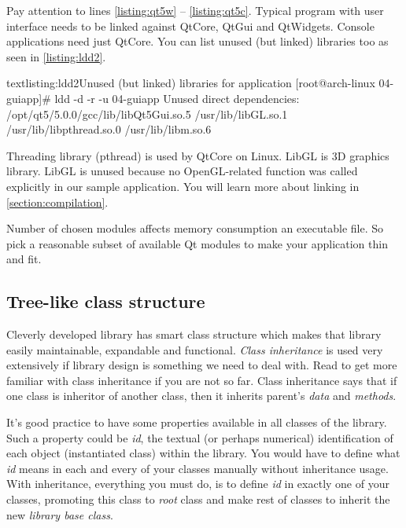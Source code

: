 Pay attention to lines \ref{listing:qt5w} -- \ref{listing:qt5c}. Typical program with user interface needs to be linked against QtCore, QtGui and QtWidgets. Console applications need just QtCore. You can list unused (but linked) libraries too as seen in \autoref{listing:ldd2}.

\begin{fdoccode}{text}{listing:ldd2}{Unused (but linked) libraries for  application}
[root@arch-linux 04-guiapp]# ldd -d -r -u 04-guiapp
Unused direct dependencies:
/opt/qt5/5.0.0/gcc/lib/libQt5Gui.so.5
/usr/lib/libGL.so.1
/usr/lib/libpthread.so.0
/usr/lib/libm.so.6
\end{fdoccode}

Threading library (pthread) is used by QtCore on Linux. LibGL is 3D graphics library. LibGL is unused because no OpenGL-related function was called explicitly in our sample application. You will learn more about linking in \autoref{section:compilation}.

Number of chosen modules affects memory consumption an executable file. So pick a reasonable subset of available Qt modules to make your application thin and fit.

\subsection{Tree-like class structure}
Cleverly developed library has smart class structure which makes that library easily maintainable, expandable and functional. \textit{Class inheritance} is used very extensively if library design is something we need to deal with. Read \citep[p.~708-783]{prata:cprimer} to get more familiar with \cpp class inheritance if you are not so far. Class inheritance says that if one class is inheritor of another class, then it inherits parent's \textit{data} and \textit{methods}.

It's good practice to have some properties available in all classes of the library. Such a property could be \eg \textit{id}, the textual (or perhaps numerical) identification of each object (instantiated class) within the library. You would have to define what \textit{id} means in each and every of your classes manually without inheritance usage. With inheritance, everything you must do, is to define \textit{id} in exactly one of your classes, promoting this class to \textit{root} class and make rest of classes to inherit the new \textit{library base class}.

